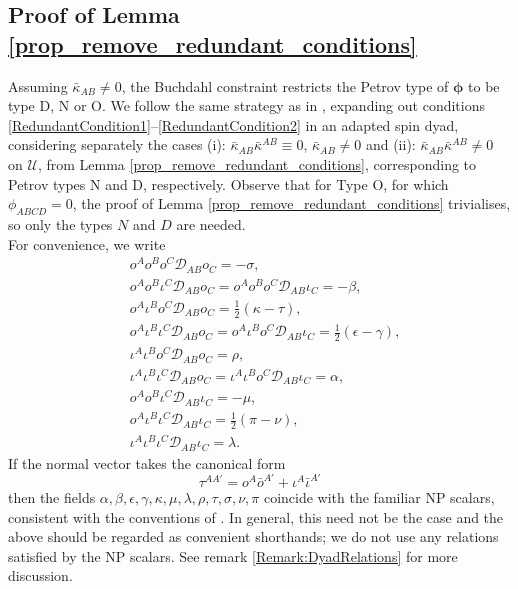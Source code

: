 \documentclass[10pt,a4paper]{article}
\theoremstyle{plain}
\begin{document}
\subsection{Proof of Lemma \ref{prop_remove_redundant_conditions}}
\label{Sec:ProofOfProp3}


Assuming $\bar{\kappa}_{AB}\neq 0$, the Buchdahl constraint restricts
the Petrov type of $\bm\phi$ to be type D, N or O.  We follow the same
strategy as in \cite{BaeVal10c}, expanding out conditions
\eqref{RedundantCondition1}--\eqref{RedundantCondition2} in an adapted
spin dyad, considering separately the cases (i):
$\bar{\kappa}_{AB}\bar{\kappa}^{AB}\equiv 0$, $\bar{\kappa}_{AB}\neq
0$ and (ii): $\bar{\kappa}_{AB}\bar{\kappa}^{AB}\neq 0$ on
$\mathcal{U}$, from Lemma \ref{prop_remove_redundant_conditions},
corresponding to Petrov types N and D, respectively.  Observe that for
Type O, for which $\phi_{ABCD}=0$, the proof of Lemma
\ref{prop_remove_redundant_conditions} trivialises, so only the types
$N$ and $D$ are needed.  \\

For convenience, we write
\begin{align*}
& o^Ao^Bo^C\mathcal{D}_{AB}o_C = -\sigma,\\
& o^Ao^B\iota^C\mathcal{D}_{AB}o_C=o^Ao^Bo^C\mathcal{D}_{AB}\iota_C=-\beta,\\
& o^A\iota^B o^C\mathcal{D}_{AB}o_C = \tfrac{1}{2}(\kappa - \tau),\\
& o^A\iota^B\iota^C\mathcal{D}_{AB}o_C = o^A\iota^B o^C\mathcal{D}_{AB}\iota_C = \tfrac{1}{2}(\epsilon - \gamma),\\
& \iota^A\iota^B o^C\mathcal{D}_{AB}o_C = \rho,\\
& \iota^A\iota^B\iota^C\mathcal{D}_{AB}o_C = \iota^A\iota^B o^C\mathcal{D}_{AB}\iota_C = \alpha,\\
& o^A o^B\iota^C\mathcal{D}_{AB}\iota_C = -\mu,\\
& o^A\iota^B\iota^C\mathcal{D}_{AB}\iota_C = \tfrac{1}{2}(\pi - \nu),\\
& \iota^A\iota^B\iota^C\mathcal{D}_{AB}\iota_C = \lambda	.
\end{align*}
If the normal vector takes the canonical form 
\[ \tau^{AA'}=o^A\bar{o}^{A'}+\iota^A\bar{\iota}^{A'}\]
then the fields $\alpha, \beta,
\epsilon, \gamma, \kappa, \mu, \lambda, \rho, \tau, \sigma, \nu, \pi$ coincide with the 
familiar NP scalars, consistent with the conventions of \cite{PenRin84}. 
In general, this need not be the case and the above should be regarded as convenient shorthands; we do not use 
any relations satisfied by the NP scalars. See remark \ref{Remark:DyadRelations} for more discussion.\\
\end{document}
